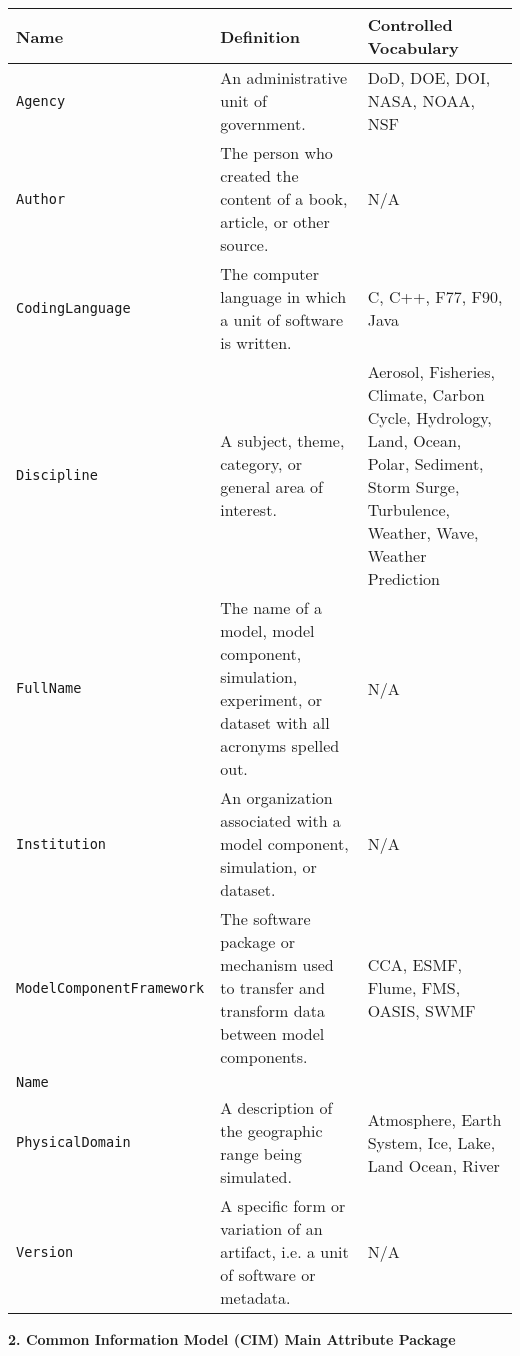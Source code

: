 \begin{tabular}{|p{8cm}|p{20cm}|p{10cm}}
     \hline\hline
     {\bf Name} & {\bf Definition} & {\bf Controlled Vocabulary}\\
     \hline\hline
     {\tt Agency} & An administrative unit of government.& DoD, DOE, DOI, NASA, NOAA, NSF\\
     {\tt Author} & The person who created the content of a book, article, or other source. & N/A\\
     {\tt CodingLanguage} & The computer language in which a unit of software is written. & C, C++, F77, F90, Java\\
     {\tt Discipline} & A subject, theme, category, or general area of interest.& Aerosol, Fisheries, Climate, Carbon Cycle, Hydrology, Land, Ocean, Polar, Sediment, Storm Surge, Turbulence, Weather, Wave, Weather Prediction \\
     {\tt FullName} & The name of a model, model component, simulation, experiment, or dataset with all acronyms spelled out.& N/A\\
     {\tt Institution} & An organization associated with a model component, simulation, or dataset.& N/A\\
     {\tt ModelComponentFramework} & The software package or mechanism used to transfer and transform data between model components.& CCA, ESMF, Flume, FMS, OASIS, SWMF \\
     {\tt Name} & \\
     {\tt PhysicalDomain} & A description of the geographic range being simulated. & Atmosphere, Earth System, Ice, Lake, Land Ocean, River\\
     {\tt Version} & A specific form or variation of an artifact, i.e. a unit of software or metadata. & N/A\\ 
\end{tabular}



\vspace{.20in}


{\bf 2. Common Information Model (CIM) Main Attribute Package}

